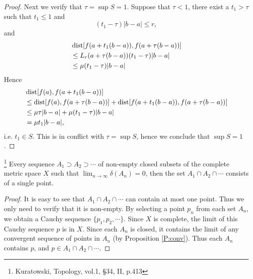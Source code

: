 \begin{proof}
Next we verify that $\tau=\sup S=1$. Suppose that $\tau<1$, there exist a
$t_1>\tau$ such that $t_1\leq 1$ and 
\[
  (t_1-\tau)|b-a| \leq r,
\]
and 
\begin{align*}
  & \operatorname*{dist}[f(a+t_1(b-a)),f(a+\tau (b-a))]  \notag \\
  &\leq L_r(a+\tau (b-a)) (t_1 - \tau) |b-a|  \notag \\
  &\leq \mu (t_1-\tau) |b-a|  \notag
\end{align*}
Hence
\begin{align*}
  &\operatorname*{dist}[f(a),f(a+ t_1 (b-a))]  \\ \notag
  &\leq \operatorname*{dist}[f(a),f(a+\tau (b-a))] + \operatorname*{dist}[f(a+t_1(b-a)),f(a+\tau (b-a))] 
    \\ \notag
  &\leq \mu \tau |b-a| + \mu (t_1 - \tau) |b-a| \notag \\
  &= \mu t_1 |b-a|, \notag
\end{align*}
i.e. $t_1\in S$. This is in conflict with $\tau=\sup S$, hence we conclude that
$\sup S=1$.
\end{proof}

\begin{theorem} \label{T:cantor_int}
\footnote{Kuratowski, Topology, vol.1, \S 34, II, p.413}
Every sequence $A_1\supset A_2\supset\cdots$ of non-empty closed subsets of
the complete metric space $X$ such that $\lim_{n\to\infty} \delta(A_n)=0$, then 
the set $A_1\cap A_2\cap\cdots$ consists of a single point.
\end{theorem}
\begin{proof}
It is easy to see that $A_1\cap A_2\cap\cdots$ can contain at most one point.
Thus we only need to verify that it is non-empty.
By selecting a point $p_n$ from each set $A_n$, we obtain a Cauchy sequence 
$\{p_1,p_2,\cdots\}$. Since $X$ is complete, the limit of this Cauchy sequence
$p$ is in $X$. Since each $A_n$ is closed, it contains the limit of any
convergent sequence of points in $A_n$ (by Proposition \ref{P:conv}).
Thus each $A_n$ contains $p$, and $p\in A_1\cap A_2\cap \cdots$.
\end{proof}

